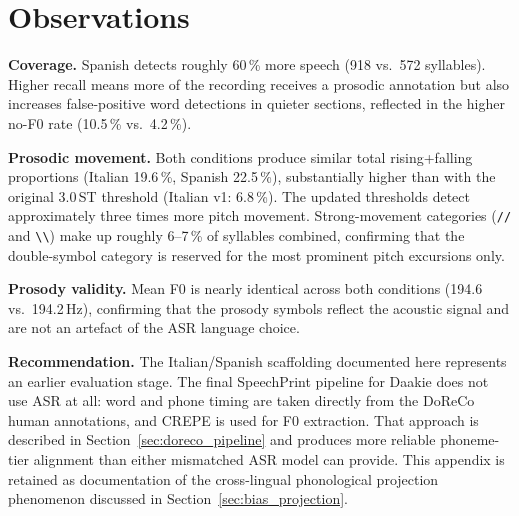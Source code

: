 \section*{Observations}

\textbf{Coverage.}
Spanish detects roughly 60\,\% more speech (918 vs.\ 572 syllables).
Higher recall means more of the recording receives a prosodic annotation
but also increases false-positive word detections in quieter sections,
reflected in the higher no-F0 rate (10.5\,\% vs.\ 4.2\,\%).

\textbf{Prosodic movement.}
Both conditions produce similar total rising+falling proportions
(Italian 19.6\,\%, Spanish 22.5\,\%), substantially higher than with the
original 3.0\,ST threshold (Italian v1: 6.8\,\%).
The updated thresholds detect approximately three times more pitch movement.
Strong-movement categories (\texttt{//} and
\texttt{\textbackslash\textbackslash}) make up roughly 6--7\,\% of syllables
combined, confirming that the double-symbol category is reserved for the
most prominent pitch excursions only.

\textbf{Prosody validity.}
Mean F0 is nearly identical across both conditions (194.6 vs.\ 194.2\,Hz),
confirming that the prosody symbols reflect the acoustic signal and are not
an artefact of the ASR language choice.

\textbf{Recommendation.}
The Italian/Spanish scaffolding documented here represents an earlier evaluation
stage. The final SpeechPrint pipeline for Daakie does not use ASR at all:
word and phone timing are taken directly from the DoReCo human annotations,
and CREPE is used for F0 extraction. That approach is described in
Section~\ref{sec:doreco_pipeline} and produces more reliable phoneme-tier
alignment than either mismatched ASR model can provide.
This appendix is retained as documentation of the cross-lingual phonological
projection phenomenon discussed in Section~\ref{sec:bias_projection}.
